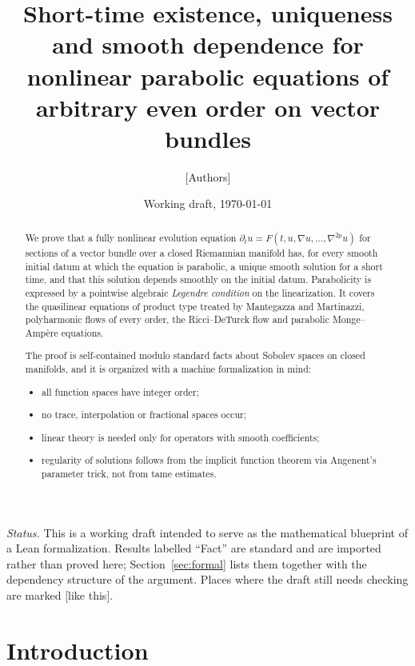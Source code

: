 \documentclass[11pt,reqno]{amsart}
\title[Short-time existence for higher-order parabolic systems]{Short-time existence, uniqueness and smooth dependence for nonlinear parabolic equations of arbitrary even order on vector bundles}
\author{[Authors]}
\date{Working draft, \today}
\theoremstyle{definition}
\theoremstyle{remark}
\newcommand{\todo}[1]{\textcolor{red!70!black}{[#1]}}
\numberwithin{equation}{section}
\begin{document}
\begin{abstract}
We prove that a fully nonlinear evolution equation
$\partial_t u = F(t,u,\nabla u,\dots,\nabla^{2p}u)$
for sections of a vector bundle over a closed Riemannian manifold has, for every smooth
initial datum at which the equation is parabolic, a unique smooth solution for a short time, and
that this solution depends smoothly on the initial datum. Parabolicity is expressed by a pointwise
algebraic \emph{Legendre condition} on the linearization. It covers the quasilinear equations of
product type treated by Mantegazza and Martinazzi, polyharmonic flows of every order, the
Ricci--DeTurck flow and parabolic Monge--Amp\`ere equations.

The proof is self-contained modulo standard facts about Sobolev spaces on closed manifolds, and it
is organized with a machine formalization in mind:
\begin{itemize}[nosep]
\item all function spaces have integer order;
\item no trace, interpolation or fractional spaces occur;
\item linear theory is needed only for operators with smooth coefficients;
\item regularity of solutions follows from the implicit function theorem via Angenent's parameter
  trick, not from tame estimates.
\end{itemize}
\end{abstract}

\maketitle

\noindent\emph{Status.} This is a working draft intended to serve as the mathematical blueprint of a
Lean formalization. Results labelled ``Fact'' are standard and are imported rather than proved here;
Section~\ref{sec:formal} lists them together with the dependency structure of the argument.
Places where the draft still needs checking are marked \todo{like this}.

\tableofcontents

\section{Introduction}\label{sec:intro}
\end{document}
